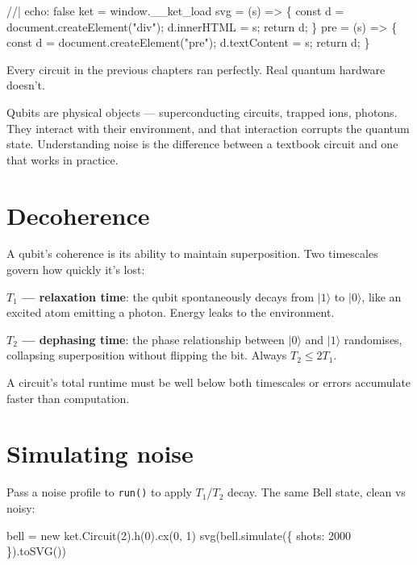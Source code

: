 \documentclass[
  11pt,
  letterpaper,
  oneside]{scrbook}
\newenvironment{Shaded}{\begin{snugshade}}{\end{snugshade}}
\newcommand{\NormalTok}[1]{\textcolor[rgb]{0.00,0.23,0.31}{#1}}
\begin{document}
\begin{Shaded}
\begin{Highlighting}[]
\NormalTok{//| echo: false}
\NormalTok{ket = window.\_\_ket\_load}
\NormalTok{svg = (s) =\textgreater{} \{ const d = document.createElement("div"); d.innerHTML = s; return d; \}}
\NormalTok{pre = (s) =\textgreater{} \{ const d = document.createElement("pre"); d.textContent = s; return d; \}}
\end{Highlighting}
\end{Shaded}

Every circuit in the previous chapters ran perfectly. Real quantum
hardware doesn't.

Qubits are physical objects --- superconducting circuits, trapped ions,
photons. They interact with their environment, and that interaction
corrupts the quantum state. Understanding noise is the difference
between a textbook circuit and one that works in practice.

\section{Decoherence}\label{decoherence}

A qubit's coherence is its ability to maintain superposition. Two
timescales govern how quickly it's lost:

\textbf{\(T_1\) --- relaxation time}: the qubit spontaneously decays
from \(|1\rangle\) to \(|0\rangle\), like an excited atom emitting a
photon. Energy leaks to the environment.

\textbf{\(T_2\) --- dephasing time}: the phase relationship between
\(|0\rangle\) and \(|1\rangle\) randomises, collapsing superposition
without flipping the bit. Always \(T_2 \leq 2T_1\).

A circuit's total runtime must be well below both timescales or errors
accumulate faster than computation.

\section{Simulating noise}\label{simulating-noise}

Pass a noise profile to \texttt{run()} to apply \(T_1\)/\(T_2\) decay.
The same Bell state, clean vs noisy:

\begin{Shaded}
\begin{Highlighting}[]
\NormalTok{bell = new ket.Circuit(2).h(0).cx(0, 1)}
\NormalTok{svg(bell.simulate(\{ shots: 2000 \}).toSVG())}
\end{Highlighting}
\end{Shaded}
\end{document}
